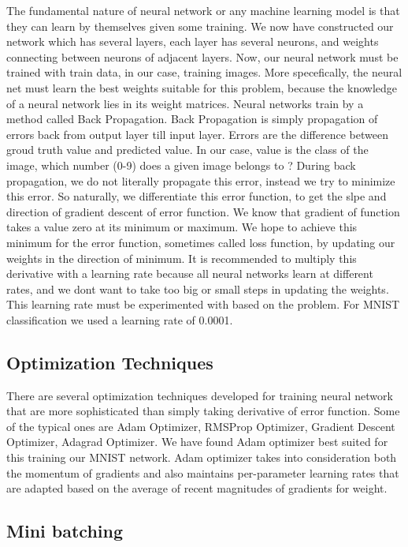The fundamental nature of neural network or any machine learning model is that
they can learn by themselves given some training. We now have constructed our
network which has several layers, each layer has several neurons, and weights
connecting between neurons of adjacent layers. Now, our neural network must be
trained with train data, in our case, training images. More specefically, the
neural net must learn the best weights suitable for this problem, because the
knowledge of a neural network lies in its weight matrices. Neural networks
train by a method called Back Propagation.  Back Propagation is simply
propagation of errors back from output layer till input layer. Errors are the
difference between groud truth value and predicted value. In our case, value
is the class of the image, which number (0-9) does a given image belongs to ?
During back propagation, we do not literally propagate this error, instead we
try to minimize this error. So naturally, we differentiate this error
function, to get the slpe and direction of gradient descent of error function.
We know that gradient of function takes a value zero at its minimum or
maximum. We hope to achieve this minimum for the error function, sometimes
called loss function, by updating our weights in the direction of minimum. It
is recommended to multiply this derivative with a learning rate because all
neural networks learn at different rates, and we dont want to take too big or
small steps in updating the weights. This learning rate must be experimented
with based on the problem. For MNIST classification we used a learning rate of
0.0001.



\subsection{Optimization Techniques} 

There are several optimization techniques developed for training neural
network that are more sophisticated than simply taking derivative of error
function. Some of the typical ones are Adam Optimizer, RMSProp Optimizer,
Gradient Descent Optimizer, Adagrad Optimizer. We have found Adam optimizer
best suited for this training our MNIST network. Adam optimizer takes into
consideration both the momentum of gradients and also maintains per-parameter
learning rates that are adapted based on the average of recent magnitudes of
gradients for weight.


\subsection{Mini batching} 

